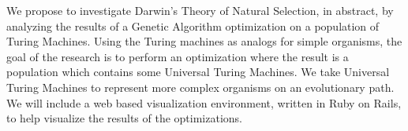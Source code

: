 We propose to investigate Darwin's Theory of Natural Selection, in abstract, by analyzing the results of a Genetic Algorithm optimization on a population of Turing Machines. Using the Turing machines as analogs for simple organisms, the goal of the research is to perform an optimization where the result is a population which contains some Universal Turing Machines. We take Universal Turing Machines to represent more complex organisms on an evolutionary path. We will include a web based visualization environment, written in Ruby on Rails, to help visualize the results of the optimizations. 